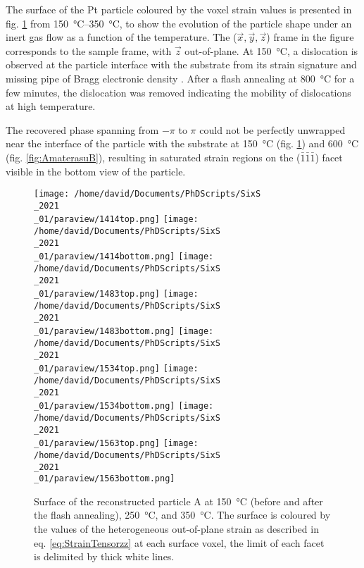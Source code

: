 The surface of the Pt particle coloured by the voxel strain values is presented in fig. \ref{fig:AmaterasuA} from \qtyrange{150}{350}{\degreeCelsius}, to show the evolution of the particle shape under an inert gas flow as a function of the temperature.
The ($\vec{x}, \vec{y}, \vec{z}$) frame in the figure corresponds to the sample frame, with $\vec{z}$ out-of-plane.
At \qty{150}{\degreeCelsius}, a dislocation is observed at the particle interface with the substrate from its strain signature and missing pipe of Bragg electronic density \parencite{Dupraz2015}.
After a flash annealing at \qty{800}{\degreeCelsius} for a few minutes, the dislocation was removed indicating the mobility of dislocations at high temperature.

The recovered phase spanning from $-\pi$ to $\pi$ could not be perfectly unwrapped near the interface of the particle with the substrate at \qty{150}{\degreeCelsius} (fig. \ref{fig:AmaterasuA}) and \qty{600}{\degreeCelsius} (fig. \ref{fig:AmaterasuB}), resulting in saturated strain regions on the ($\bar{1}\bar{1}\bar{1}$) facet visible in the bottom view of the particle.

\begin{figure}[!htb]
    \centering
    \texttt{[image: /home/david/Documents/PhDScripts/SixS\\\_2021\\\_01/paraview/1414top.png]}
    \texttt{[image: /home/david/Documents/PhDScripts/SixS\\\_2021\\\_01/paraview/1414bottom.png]}
    \texttt{[image: /home/david/Documents/PhDScripts/SixS\\\_2021\\\_01/paraview/1483top.png]}
    \texttt{[image: /home/david/Documents/PhDScripts/SixS\\\_2021\\\_01/paraview/1483bottom.png]}
    \texttt{[image: /home/david/Documents/PhDScripts/SixS\\\_2021\\\_01/paraview/1534top.png]}
    \texttt{[image: /home/david/Documents/PhDScripts/SixS\\\_2021\\\_01/paraview/1534bottom.png]}
    \texttt{[image: /home/david/Documents/PhDScripts/SixS\\\_2021\\\_01/paraview/1563top.png]}
    \texttt{[image: /home/david/Documents/PhDScripts/SixS\\\_2021\\\_01/paraview/1563bottom.png]}
    \caption{
        Surface of the reconstructed particle A at \qty{150}{\degreeCelsius} (before and after the flash annealing), \qty{250}{\degreeCelsius}, and \qty{350}{\degreeCelsius}.
        The surface is coloured by the values of the heterogeneous out-of-plane strain as described in eq. \ref{eq:StrainTensorzz} at each surface voxel, the limit of each facet is delimited by thick white lines.
    }
    \label{fig:AmaterasuA}
\end{figure}

